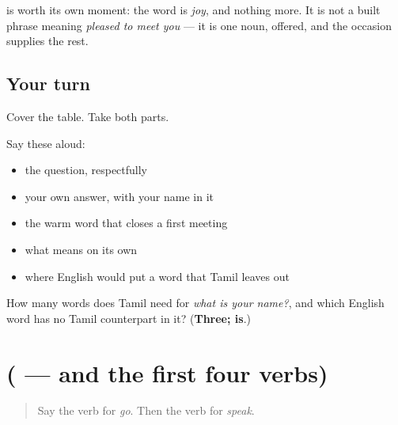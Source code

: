 \textbf{} is worth its own moment: the word is \emph{joy}, and nothing more. It is not a built phrase meaning \emph{pleased to meet you} — it is one noun, offered, and the occasion supplies the rest.

\subsection*{Your turn}
Cover the table. Take both parts.

Say these aloud:

\begin{itemize}
\raggedright
  \item the question, respectfully
  \item your own answer, with your name in it
  \item the warm word that closes a first meeting
  \item what \textbf{} means on its own
  \item where English would put a word that Tamil leaves out
\end{itemize}

\begin{tcolorbox}[breakable,colback=teal!4,colframe=teal!35!black,title={Before you move on}]
How many words does Tamil need for \emph{what is your name?}, and which English word has no Tamil counterpart in it? (\textbf{Three; is}.)
\end{tcolorbox}
\section[\texorpdfstring{(\ta{போய்} \ta{வருகிறேன்} — and the first four …}{(போய் வருகிறேன் — and the first four …}]{(  — and the first four verbs)}

\label{lesson:TA-R85-going-and-doing}



\begin{quote}
Say the verb for \emph{go}. Then the verb for \emph{speak}.
\end{quote}

